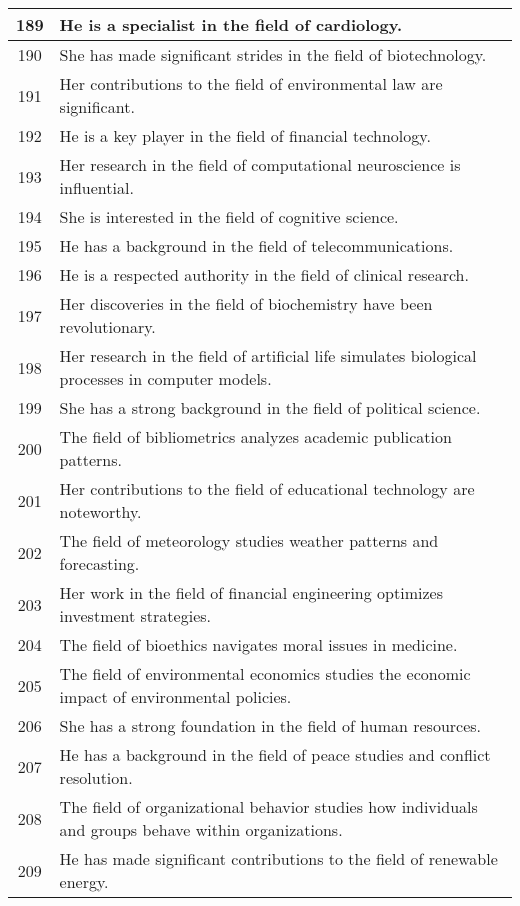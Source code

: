 \begin{longtable}{|c|p{12cm}|}
189 & He is a specialist in the field of cardiology. \\ \hline
190 & She has made significant strides in the field of biotechnology. \\ \hline
191 & Her contributions to the field of environmental law are significant. \\ \hline
192 & He is a key player in the field of financial technology. \\ \hline
193 & Her research in the field of computational neuroscience is influential. \\ \hline
194 & She is interested in the field of cognitive science. \\ \hline
195 & He has a background in the field of telecommunications. \\ \hline
196 & He is a respected authority in the field of clinical research. \\ \hline
197 & Her discoveries in the field of biochemistry have been revolutionary. \\ \hline
198 & Her research in the field of artificial life simulates biological processes in computer models. \\ \hline
199 & She has a strong background in the field of political science. \\ \hline
200 & The field of bibliometrics analyzes academic publication patterns. \\ \hline
201 & Her contributions to the field of educational technology are noteworthy. \\ \hline
202 & The field of meteorology studies weather patterns and forecasting. \\ \hline
203 & Her work in the field of financial engineering optimizes investment strategies. \\ \hline
204 & The field of bioethics navigates moral issues in medicine. \\ \hline
205 & The field of environmental economics studies the economic impact of environmental policies. \\ \hline
206 & She has a strong foundation in the field of human resources. \\ \hline
207 & He has a background in the field of peace studies and conflict resolution. \\ \hline
208 & The field of organizational behavior studies how individuals and groups behave within organizations. \\ \hline
209 & He has made significant contributions to the field of renewable energy. \\ \hline

\end{longtable}
